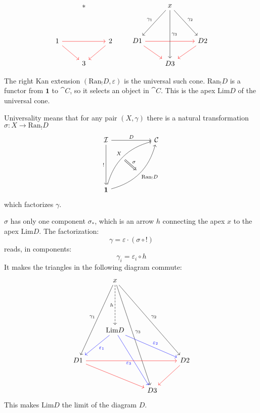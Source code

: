 \documentclass[DaoFP]{subfiles}
\begin{document}
\[
 \begin{tikzcd}
  & *
 \\
\\
1 
\arrow[rr, red]
\arrow[rd, red]
&& 2
\arrow[dl, red]
\\
& 3
 \end{tikzcd}
 \qquad
 \begin{tikzcd}
  & x
\arrow[ddr, "\gamma_2"]
 \arrow[ddl, "\gamma_1"']
 \arrow[ddd, "\gamma_3"]
 \\
\\
D 1 
\arrow[rr, red]
\arrow[rd, red]
&& D 2
\arrow[dl, red]
\\
& D 3
 \end{tikzcd}
 \]



The right Kan extension $(\text{Ran}_! D, \varepsilon)$ is the universal such cone. $\text{Ran}_! D$ is a functor from $\mathbf 1$ to $\cat C$, so it selects an object in $\cat C$. This is the apex $\text{Lim} D$ of the universal cone. 

Universality means that for any pair $(X, \gamma)$ there is a natural transformation $\sigma \colon X \to \text{Ran}_! D$ 
\[
\begin{tikzcd}[row sep=2cm, column sep=2cm]
\cat I  \ar[d, "!"', "" {name=P}]
            \ar[r, "D", ""  {name=F, below, near start, bend right}]
&
\cat C
\\
\mathbf 1
    \ar[ur, bend left, "X", "" {name=G, below}]
    \ar[ur, bend right, "\text{Ran}_! D"', "" {name=Ran}]
\arrow[Rightarrow, "\sigma", from=G, to=Ran]
\end{tikzcd}
\]
which factorizes $\gamma$. 

$\sigma$ has only one component $\sigma_*$, which is an arrow $h$ connecting the apex $x$ to the apex $\text{Lim} D$. The factorization:
 \[ \gamma = \varepsilon \cdot (\sigma \circ !) \]
reads, in components:
\[ \gamma_i = \varepsilon_i \circ h \]
It makes the triangles in the following diagram commute:
\[
 \begin{tikzcd}[row sep=1cm]
  & x
\arrow[dddl, "\gamma_1"']
\arrow[ddddr, "\gamma_3"]
\arrow[dddrr, "\gamma_2"]
\arrow[dd, dashed, "h"']
 \\
 \\
 & \text{Lim} D
\arrow[dl, blue, "\varepsilon_1"]
\arrow[ddr, blue, "\varepsilon_3"']
\arrow[drr, blue, "\varepsilon_2"]
\\
D 1 
\arrow[rrr, red]
\arrow[rrd, red]
&&& D 2
\arrow[dl, red]
\\
&& D 3
 \end{tikzcd}
 \]
This makes $\text{Lim} D$ the limit of the diagram $D$.
\end{document}
